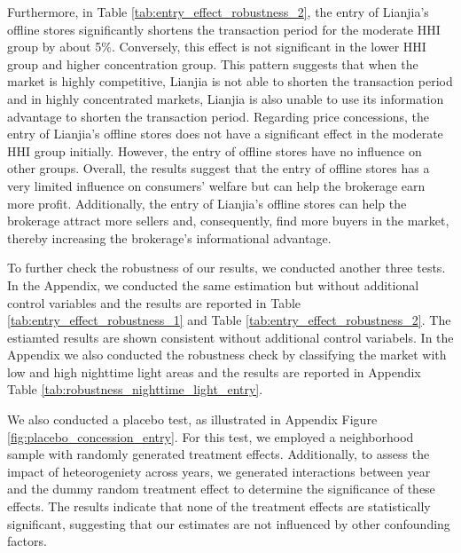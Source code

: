 \documentclass[11pt]{article}
\begin{document}
Furthermore, in Table \ref{tab:entry_effect_robustness_2}, the entry of Lianjia's offline stores significantly shortens the transaction period for the moderate HHI group by about 5\%. Conversely, this effect is not significant in the lower HHI group and higher concentration group. This pattern suggests that when the market is highly competitive, Lianjia is not able to shorten the transaction period and in highly concentrated markets, Lianjia is also unable to use its information advantage to shorten the transaction period. Regarding price concessions, the entry of Lianjia's offline stores does not have a significant effect in the moderate HHI group initially. However, the entry of offline stores have no influence on other groups. Overall, the results suggest that the entry of offline stores has a very limited influence on consumers' welfare but can help the brokerage earn more profit. Additionally, the entry of Lianjia's offline stores can help the brokerage attract more sellers and, consequently, find more buyers in the market, thereby increasing the brokerage's informational advantage. 

To further check the robustness of our results, we conducted another three tests. In the Appendix, we conducted the same estimation but without additional control variables and the results are reported in Table \ref{tab:entry_effect_robustness_1} and Table \ref{tab:entry_effect_robustness_2}. The estiamted results are shown consistent without additional control variabels. In the Appendix we also conducted the robustness check by classifying the market with low and high nighttime light areas and the results are reported in Appendix Table \ref{tab:robustness_nighttime_light_entry}.

We also conducted a placebo test, as illustrated in Appendix Figure \ref{fig:placebo_concession_entry}. For this test, we employed a neighborhood sample with randomly generated treatment effects. Additionally, to assess the impact of heteorogeniety across years, we generated interactions between year and the dummy random treatment effect to determine the significance of these effects. The results indicate that none of the treatment effects are statistically significant, suggesting that our estimates are not influenced by other confounding factors.
\end{document}
